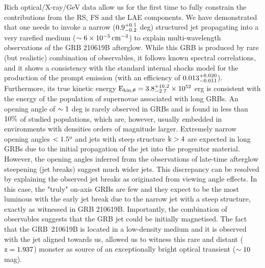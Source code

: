 \documentclass{naturesubmissionstyle}
\begin{document}
Rich optical/X-ray/GeV data allow us for the first time to fully constrain the contributions from the RS, FS and the LAE components. We have demonstrated that one needs to invoke a narrow ($\rm 0.9_{-0.2}^{+0.1}$ deg) structured jet propagating into a very rarefied medium ($\rm \sim 6 \times 10^{-5} \, cm^{-3}$) to explain multi-wavelength observations of the GRB 210619B afterglow. While this GRB is produced by rare (but realistic) combination of observables,
it follows known spectral correlations\cite{Amati2002,Yonetoku2004,Ghirlanda2004}, and it shows a consistency with the standard internal shocks model for the production of the prompt 
emission (with an efficiency of $\rm 0.013_{-0.011}^{+0.020}$)\cite{Kobayashi1997,Daigne1998}. Furthermore, its true kinetic energy $\rm E_{kin,\theta} = 3.8_{-2.7}^{+10.2} \times 10^{52}$ erg is consistent with the energy of the population of supernovae associated with long GRBs\cite{Woosley2006}. An opening angle of $\rm \sim 1$ deg is rarely observed in GRBs\cite{Ryan2015} and is found in less than $\rm 10\%$ of studied populations\cite{Wang2018}, which are, however, usually embedded in environments with densities orders of magnitude larger. Extremely narrow opening angles $\rm <1.5^{o}$ and jets with steep structure $\rm k>4$ are expected in long GRBs due to the initial propagation of the jet into the progenitor material\cite{Salafia2020,Gottlieb2021}. However, the opening angles inferred from the observations of late-time afterglow steepening (jet breaks) suggest much wider jets\cite{Wang2018}. This discrepancy can be resolved by explaining the observed jet breaks as originated from viewing angle effects\cite{Kumar2003}. In this case, the "truly" on-axis GRBs are few and they expect to be the most luminous with the early jet break due to the narrow jet with a steep structure, exactly as witnessed in GRB 210619B. Importantly, the combination of observables suggests that the GRB jet could be initially magnetised\cite{Usov1992,Thompson1994,Meszaros1997b}. The fact that the GRB~210619B is located in a low-density medium and it is observed with the jet aligned towards us, allowed us to witness this rare and distant ($\rm z=1.937$) monster as source of an exceptionally bright optical transient ($\rm \sim 10$ mag). 



\newpage 
\end{document}
